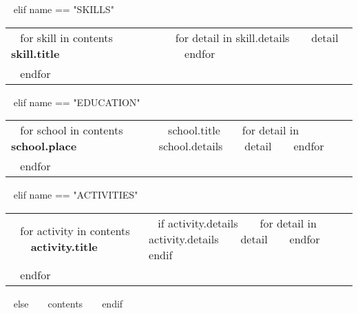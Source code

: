 \begin{minipage}{\textwidth}
~{ elif name == "SKILLS" }~
  \begin{tabular}{ @{} p{32mm} p{135mm} @{} }
  ~{ for skill in contents }~
    \bf\small ~{{ skill.title }}~ & {\small
    ~{ for detail in skill.details }~
        ~{{ detail }}~
    ~{ endfor }~
    } \\
  ~{ endfor }~
  \end{tabular}

~{ elif name == "EDUCATION" }~
  \begin{tabular}{ @{} p{32mm} p{135mm} @{} }
  ~{ for school in contents }~
    \bf\small ~{{ school.place }}~ & {\small
    ~{{ school.title }}~
    ~{ for detail in school.details }~
        ~{{ detail }}~
    ~{ endfor }~
    } \\
  ~{ endfor }~
  \end{tabular}
  \vspace{10mm}

~{ elif name == "ACTIVITIES" }~
  \begin{tabular}{ @{} p{32mm} p{135mm} @{} }
  ~{ for activity in contents }~
    \bf\small ~{{ activity.title }}~ & {\small
    ~{ if activity.details }~
        ~{ for detail in activity.details }~
            ~{{ detail }}~
        ~{ endfor }~
    ~{ endif }~
    } \\
  ~{ endfor }~
  \end{tabular}
  \vspace{10mm}

~{ else }~
  ~{{ contents }}~
  \bigskip
~{ endif }~
\end{minipage}
